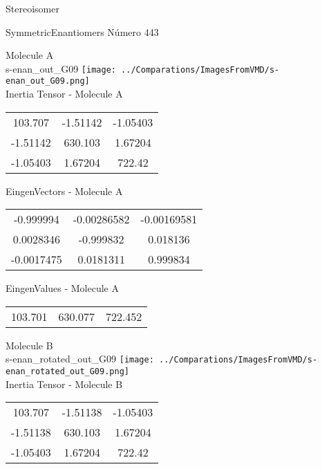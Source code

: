 \begin{center}
\vtab
\vtab
\textcolor{NavyBlue}{\Large Stereoisomer}
\end{center}

 \newpage

\vtab[-2cm]
\begin{center}
{\large SymmetricEnantiomers \tab Número 443}
\end{center}
\begin{multicols}{2}
\begin{center}

Molecule A \\ 
s-enan\_out\_G09
\texttt{[image: ../Comparations/ImagesFromVMD/s-enan\_out\_G09.png]}
\\
Inertia Tensor - Molecule A \\
\vtab

\begin{tabular}{|c c c|}
103.707	 & 	-1.51142	 & 	-1.05403	 \\
-1.51142	 & 	630.103	 & 	1.67204	 \\
-1.05403	 & 	1.67204	 & 	722.42
\end{tabular}

\vtab
 EingenVectors - Molecule A     \\
\vtab
\begin{tabular}{|c c c|}
-0.999994	 & 	-0.00286582	 & 	-0.00169581	 \\
0.0028346	 & 	-0.999832	 & 	0.018136	 \\
-0.0017475	 & 	0.0181311	 & 	0.999834
\end{tabular}

\vtab
 EingenValues - Molecule A     \\
\vtab
\begin{tabular}{|c c c|}
103.701	 & 	630.077	 & 	722.452	 \\
\end{tabular}
\columnbreak

Molecule B \\ 
s-enan\_rotated\_out\_G09
\texttt{[image: ../Comparations/ImagesFromVMD/s-enan\_rotated\_out\_G09.png]}
\\
Inertia Tensor - Molecule B \\
\vtab

\begin{tabular}{|c c c|}
103.707	 & 	-1.51138	 & 	-1.05403	 \\
-1.51138	 & 	630.103	 & 	1.67204	 \\
-1.05403	 & 	1.67204	 & 	722.42
\end{tabular}


\end{center}
\end{multicols}
